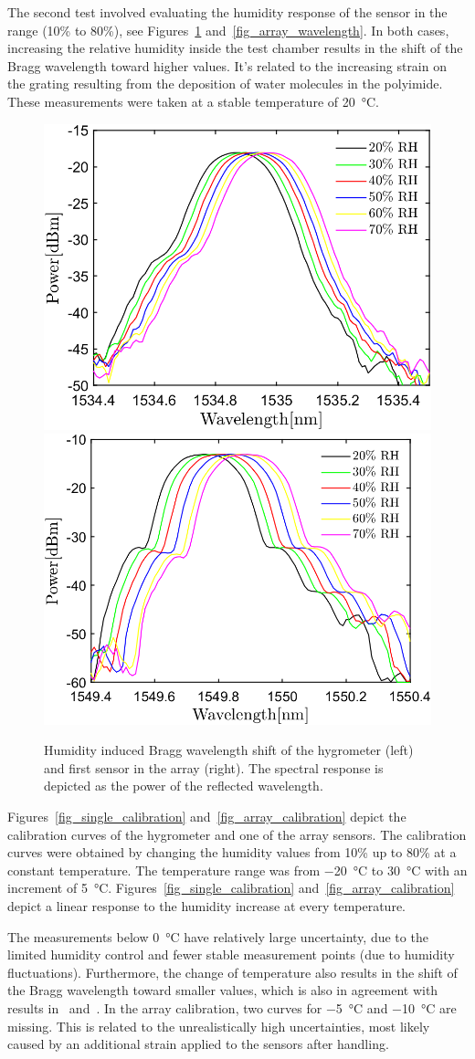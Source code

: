 The second test involved evaluating the humidity response of the sensor in the range (10\% to 80\%), see Figures~\ref{fig_response} and~\ref{fig_array_wavelength}. In both cases, increasing the relative humidity inside the test chamber results in the shift of the Bragg wavelength toward higher values. It's related to the increasing strain on the grating resulting from the deposition of water molecules in the polyimide. These measurements were taken at a stable temperature of \SI{20}{\celsius}.
\begin{figure}[!h]
\centering
\includegraphics[width=0.45\columnwidth]{Chapter5/images/rh.png}
\includegraphics[width=0.475\columnwidth]{Chapter5/images/rh_array2.png}
\caption{Humidity induced Bragg wavelength shift of the hygrometer (left) and first sensor in the array (right). The spectral response is depicted as the power of the reflected wavelength. }
\label{fig_response}
\end{figure}
\newpage
Figures~\ref{fig_single_calibration} and~\ref{fig_array_calibration} depict the calibration curves of the hygrometer and one of the array sensors. The calibration curves were obtained by changing the humidity values from 10\% up to 80\% at a constant temperature. The temperature range was from \SI{-20}{\celsius} to \SI{30}{\celsius} with an increment of \SI{5}{\celsius}. Figures~\ref{fig_single_calibration} and~\ref{fig_array_calibration} depict a linear response to the humidity increase at every temperature.

The measurements below \SI{0}{\celsius} have relatively large uncertainty, due to the limited humidity control and fewer stable measurement points (due to humidity fluctuations). Furthermore, the change of temperature also results in the shift of the Bragg wavelength toward smaller values, which is also in agreement with results in~\cite{Kronenberg:02} and~\cite{Berruti}. In the array calibration, two curves for \SI{-5}{\celsius} and \SI{-10}{\celsius} are missing. This is related to the unrealistically high uncertainties, most likely caused by an additional strain applied to the sensors after handling. %

